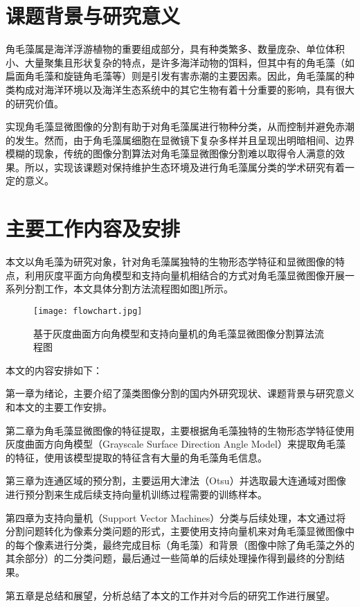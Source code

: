 \section{课题背景与研究意义}
角毛藻属是海洋浮游植物的重要组成部分，具有种类繁多、数量庞杂、单位体积小、大量聚集且形状复杂的特点，是许多海洋动物的饵料，但其中有的角毛藻（如扁面角毛藻和旋链角毛藻等）则是引发有害赤潮的主要因素。因此，角毛藻属的种类构成对海洋环境以及海洋生态系统中的其它生物有着十分重要的影响，具有很大的研究价值。

实现角毛藻显微图像的分割有助于对角毛藻属进行物种分类，从而控制并避免赤潮的发生。然而，由于角毛藻属细胞在显微镜下复杂多样并且呈现出明暗相间、边界模糊的现象，传统的图像分割算法对角毛藻显微图像分割难以取得令人满意的效果。所以，实现该课题对保持维护生态环境及进行角毛藻属分类的学术研究有着一定的意义。


 \section{主要工作内容及安排}
 本文以角毛藻为研究对象，针对角毛藻属独特的生物形态学特征和显微图像的特点，利用灰度平面方向角模型和支持向量机相结合的方式对角毛藻显微图像开展一系列分割工作，本文具体分割方法流程图如图\ref{flowchart}所示。

   \begin{figure}[ht!]
   \centering
  \texttt{[image: flowchart.jpg]}
  \caption{基于灰度曲面方向角模型和支持向量机的角毛藻显微图像分割算法流程图}
    \label{flowchart}
 \end{figure}

本文的内容安排如下：

第一章为绪论，主要介绍了藻类图像分割的国内外研究现状、课题背景与研究意义和本文的主要工作安排。

第二章为角毛藻显微图像的特征提取，主要根据角毛藻独特的生物形态学特征使用灰度曲面方向角模型（Grayscale Surface Direction Angle Model）来提取角毛藻的特征，使用该模型提取的特征含有大量的角毛藻角毛信息。

第三章为连通区域的预分割，主要运用大津法（Otsu）并选取最大连通域对图像进行预分割来生成后续支持向量机训练过程需要的训练样本。

第四章为支持向量机（Support Vector Machines）分类与后续处理，本文通过将分割问题转化为像素分类问题的形式，主要使用支持向量机来对角毛藻显微图像中的每个像素进行分类，最终完成目标（角毛藻）和背景（图像中除了角毛藻之外的其余部分）的二分类问题，最后通过一些简单的后续处理操作得到最终的分割结果。

第五章是总结和展望，分析总结了本文的工作并对今后的研究工作进行展望。

